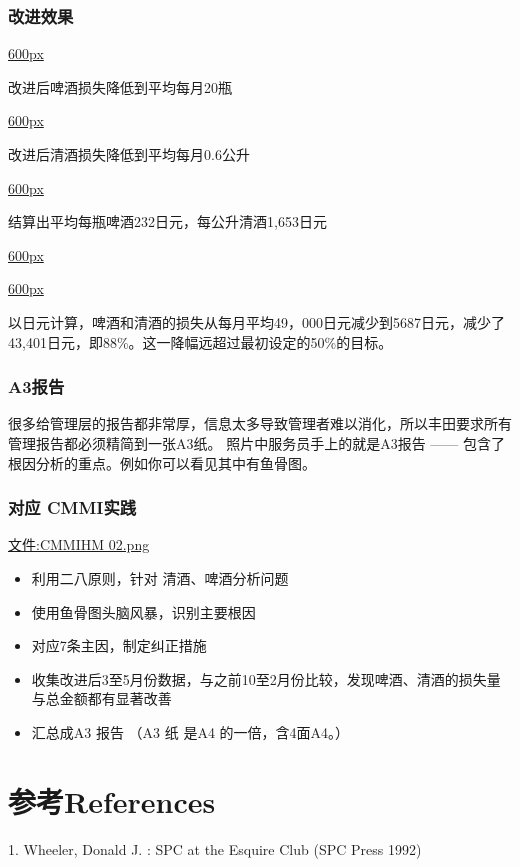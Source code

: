 \hypertarget{ux6539ux8fdbux6548ux679c}{%
\subsubsection{改进效果}\label{ux6539ux8fdbux6548ux679c}}

\href{文件:club19.1.jpg}{600px}

改进后啤酒损失降低到平均每月20瓶

\href{文件:club20.1.jpg}{600px}

改进后清酒损失降低到平均每月0.6公升

\href{文件:club20.2.jpg}{600px}

结算出平均每瓶啤酒232日元，每公升清酒1,653日元

\href{文件:club21.1.jpg}{600px}

\href{文件:club22.1.jpg}{600px}

以日元计算，啤酒和清酒的损失从每月平均49，000日元减少到5687日元，减少了43,401日元，即88\%。这一降幅远超过最初设定的50\%的目标。

\hypertarget{a3ux62a5ux544a}{%
\subsubsection{A3报告}\label{a3ux62a5ux544a}}

很多给管理层的报告都非常厚，信息太多导致管理者难以消化，所以丰田要求所有管理报告都必须精简到一张A3纸。
照片中服务员手上的就是A3报告 ------
包含了根因分析的重点。例如你可以看见其中有鱼骨图。

\hypertarget{ux5bf9ux5e94-cmmiux5b9eux8df5}{%
\subsubsection{对应 CMMI实践}\label{ux5bf9ux5e94-cmmiux5b9eux8df5}}

\href{文件:CMMIHM_02.png}{文件:CMMIHM 02.png}

\begin{itemize}
\tightlist
\item
  利用二八原则，针对 清酒、啤酒分析问题
\item
  使用鱼骨图头脑风暴，识别主要根因
\item
  对应7条主因，制定纠正措施
\item
  收集改进后3至5月份数据，与之前10至2月份比较，发现啤酒、清酒的损失量与总金额都有显著改善
\item
  汇总成A3 报告 （A3 纸 是A4 的一倍，含4面A4。）
\end{itemize}

\hypertarget{ux53c2ux8003references}{%
\section{参考References}\label{ux53c2ux8003references}}

1. Wheeler, Donald J. : SPC at the Esquire Club (SPC Press 1992)


